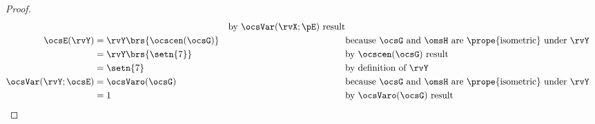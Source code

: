 \begin{tabstr}{0.75}
\begin{proof}
\begin{align*}
        && \text{by $\ocsVar(\rvX;\pE)$ result}
      \\
      \ocsE(\rvY)
        &= \rvY\brs{\ocscen(\ocsG)}
        && \text{because $\ocsG$ and $\omsH$ are \prope{isometric} under $\rvY$}
      \\&= \rvY\brs{\setn{7}}
        && \text{by $\ocscen(\ocsG)$ result}
      \\&= \setn{7}
        && \text{by definition of $\rvY$}
      \\
      \ocsVar(\rvY;\ocsE)
        &= \ocsVaro(\ocsG)
        && \text{because $\ocsG$ and $\omsH$ are \prope{isometric} under $\rvY$}
      \\&= 1
        && \text{by $\ocsVaro(\ocsG)$ result}
  \end{align*}
\end{proof}



\end{tabstr}
